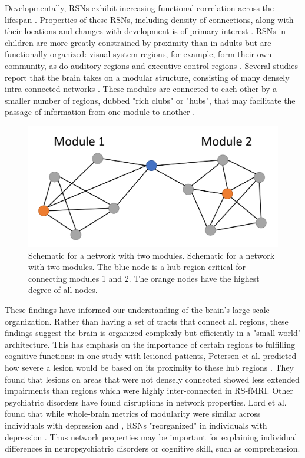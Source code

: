 Developmentally, RSNs exhibit increasing functional correlation across the lifespan \citep{Kesler2013, Uddin2010}. Properties of these RSNs, including density of connections, along with their locations and changes with development is of primary interest  \citep{Cole2014, Dosenbach2007, Fair2009}. RSNs in children are more greatly constrained by proximity than in adults but are functionally organized: visual system regions, for example, form their own community, as do auditory regions and executive control regions \citep{Seeley2007}. Several studies report that the brain takes on a modular structure, consisting of many densely intra-connected networks \citep{Bullmore2009, Fair2009, Supekar2009, Dosenbach2007}. These modules are connected to each other by a smaller number of regions, dubbed "rich clubs" or "hubs", that may facilitate the passage of information from one module to another \citep{Power2013, Bullmore2012}. 

\begin{figure}[t]
    \centering
    \includegraphics[width=14cm]{images/ch1-graph-schema.png}
    \caption{Schematic for a network with two modules. Schematic for a network with two modules. The blue node is a hub region critical for connecting modules 1 and 2. The orange nodes have the highest degree of all nodes.}
\end{figure}

These findings have informed our understanding of the brain's large-scale organization. Rather than having a set of tracts that connect all regions, these findings suggest the brain is organized complexly but efficiently in a "small-world" architecture. This has emphasis on the importance of certain regions to fulfilling cognitive functions: in one study with lesioned patients, Petersen et al. predicted how severe a lesion would be based on its proximity to these hub regions \citep{Warren2014}. They found that lesions on areas that were not densely connected showed less extended impairments than regions which were highly inter-connected in RS-fMRI. Other psychiatric disorders have found disruptions in network properties. Lord et al. found that while whole-brain metrics of modularity were similar across individuals with depression and , RSNs "reorganized" in individuals with depression \citep{Lord2012}. Thus network properties may be important for explaining individual differences in neuropsychiatric disorders or cognitive skill, such as comprehension. 

